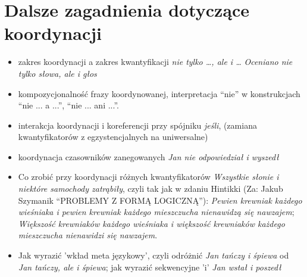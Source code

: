 \documentclass[a4paper,12pt]{article}
\begin{document}
\section{Dalsze zagadnienia dotyczące koordynacji}
\begin{itemize}
\item zakres koordynacji a zakres kwantyfikacji {\it nie tylko \dots, ale i \dots} {\it Oceniano nie tylko słowa, ale i głos}
\item kompozycjonalność frazy koordynowanej,
interpretacja ``nie'' w konstrukcjach ``nie ... a ...'', ``nie ... ani ...''.
\item interakcja koordynacji i koreferencji przy spójniku {\it jeśli}, (zamiana kwantyfikatorów z egzystencjalnych na uniwersalne)
\item koordynacja czasowników zanegowanych {\it Jan nie odpowiedział i wyszedł}
\item  Co zrobić przy koordynacji różnych kwantyfikatorów {\it Wszystkie słonie i niektóre samochody zatrąbiły}, czyli
tak jak w zdaniu Hintikki (Za: Jakub Szymanik ``PROBLEMY Z FORMĄ LOGICZNĄ''): 
{\it Pewien krewniak każdego wieśniaka i pewien krewniak każdego mieszczucha nienawidzą się nawzajem};
{\it Większość krewniaków każdego wieśniaka i większość krewniaków każdego mieszczucha nienawidzi się nawzajem}.
\item Jak wyrazić 'wkład meta językowy', czyli odróżnić {\it Jan tańczy i śpiewa} od {\it Jan tańczy, ale i śpiewa};
jak wyrazić sekwencyjne 'i' {\it Jan wstał i poszedł}
\end{itemize}
\end{document}
